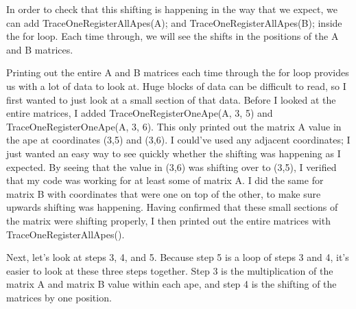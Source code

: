 \documentclass[10pt]{article}
\begin{document}
In order to check that this shifting is happening in the way that we expect, we can add TraceOneRegisterAllApes(A); and TraceOneRegisterAllApes(B); inside the for loop.  Each time through, we will see the shifts in the positions of the A and B matrices.  \par
Printing out the entire A and B matrices each time through the for loop provides us with a lot of data to look at.  Huge blocks of data can be difficult to read, so I first wanted to just look at a small section of that data.  Before I looked at the entire matrices, I added TraceOneRegisterOneApe(A, 3, 5) and TraceOneRegisterOneApe(A, 3, 6).  This only printed out the matrix A value in the ape at coordinates (3,5) and (3,6).  I could’ve used any adjacent coordinates; I just wanted an easy way to see quickly whether the shifting was happening as I expected.  By seeing that the value in (3,6) was shifting over to (3,5), I verified that my code was working for at least some of matrix A.  I did the same for matrix B with coordinates that were one on top of the other, to make sure upwards shifting was happening.  Having confirmed that these small sections of the matrix were shifting properly, I then printed out the entire matrices with TraceOneRegisterAllApes(). \par
Next, let’s look at steps 3, 4, and 5.  Because step 5 is a loop of steps 3 and 4, it’s easier to look at these three steps together.  Step 3 is the multiplication of the matrix A and matrix B value within each ape, and step 4 is the shifting of the matrices by one position. \par
\end{document}
